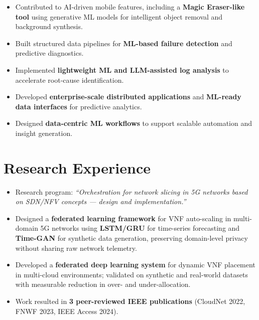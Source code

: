 \documentclass{resume}
\begin{document}
\begin{itemize}\setlength{\itemsep}{0pt}\setlength{\parskip}{0pt}
    \item Contributed to AI-driven mobile features, including a \textbf{Magic Eraser-like tool} using generative ML models for intelligent object removal and background synthesis.
    \item Built structured data pipelines for \textbf{ML-based failure detection} and predictive diagnostics.
    \item Implemented \textbf{lightweight ML and LLM-assisted log analysis} to accelerate root-cause identification.
\end{itemize}

\begin{itemize}\setlength{\itemsep}{0pt}\setlength{\parskip}{0pt}
    \item Developed \textbf{enterprise-scale distributed applications} and \textbf{ML-ready data interfaces} for predictive analytics.
    \item Designed \textbf{data-centric ML workflows} to support scalable automation and insight generation.
\end{itemize}

\section{Research Experience}

\begin{itemize}\setlength{\itemsep}{0pt}\setlength{\parskip}{0pt}
    \item Research program: \textit{``Orchestration for network slicing in 5G networks based on SDN/NFV concepts --- design and implementation.''}
    \item Designed a \textbf{federated learning framework} for VNF auto-scaling in multi-domain 5G networks using \textbf{LSTM/GRU} for time-series forecasting and \textbf{Time-GAN} for synthetic data generation, preserving domain-level privacy without sharing raw network telemetry.
    \item Developed a \textbf{federated deep learning system} for dynamic VNF placement in multi-cloud environments; validated on synthetic and real-world datasets with measurable reduction in over- and under-allocation.
    \item Work resulted in \textbf{3 peer-reviewed IEEE publications} (CloudNet 2022, FNWF 2023, IEEE Access 2024).
\end{itemize}
\end{document}
